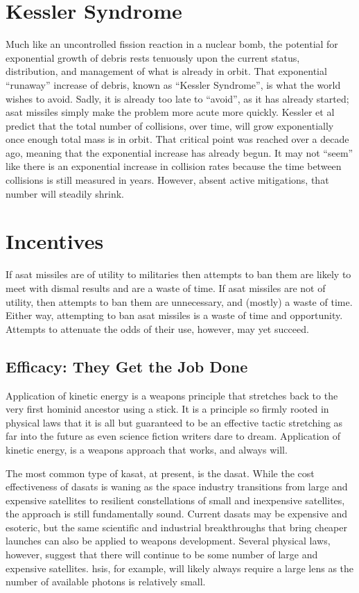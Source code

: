 \section*{Kessler Syndrome}

Much like an uncontrolled fission reaction in a nuclear bomb, the
potential for exponential growth of debris rests tenuously upon the
current status, distribution, and management of what is already in
orbit.  That exponential ``runaway'' increase of debris, known as
``Kessler Syndrome'', is what the world wishes to avoid.  Sadly, it is
already too late to ``avoid'', as it has already started; \ac{asat}
missiles simply make the problem more acute more quickly.  Kessler et
al predict that the total number of collisions, over time, will grow
exponentially once enough total mass is in orbit.  That critical point
was reached over a decade ago, meaning that the exponential increase
has already begun.  It may not ``seem'' like there is an exponential
increase in collision rates because the time between collisions is
still measured in years.  However, absent active mitigations, that
number will steadily shrink.


\section*{Incentives}

If \ac{asat} missiles are of utility to militaries then attempts to
ban them are likely to meet with dismal results and are a waste of
time.  If \ac{asat} missiles are not of utility, then attempts to ban
them are unnecessary, and (mostly) a waste of time.  Either way,
attempting to ban \ac{asat} missiles is a waste of time and
opportunity.  Attempts to attenuate the odds of their use, however,
may yet succeed.

\subsection*{Efficacy: They Get the Job Done}

Application of kinetic energy is a weapons principle that stretches
back to the very first hominid ancestor using a stick.  It is a
principle so firmly rooted in physical laws that it is all but
guaranteed to be an effective tactic stretching as far into the future
as even science fiction writers dare to dream.  Application of kinetic
energy, is a weapons approach that works, and always will.

The most common type of \ac{kasat}, at present, is the \ac{dasat}.
While the cost effectiveness of \acp{dasat} is waning as the space
industry transitions from large and expensive satellites to resilient
constellations of small and inexpensive satellites, the approach is
still fundamentally sound.  Current \acp{dasat} may be expensive and
esoteric, but the same scientific and industrial breakthroughs that
bring cheaper launches can also be applied to weapons development.
Several physical laws, however, suggest that there will continue to be
some number of large and expensive satellites.  \acp{hsi}, for
example, will likely always require a large lens as the number of
available photons is relatively small.


